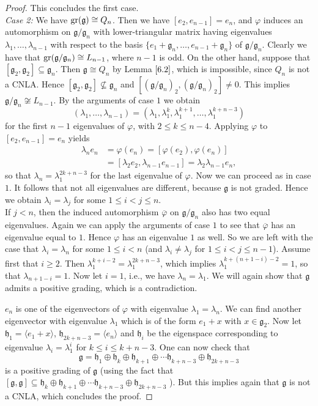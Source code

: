 \documentclass[12pt]{amsart}
\theoremstyle{definition}
\theoremstyle{remark}
\newcommand{\Lg}{\mathfrak{g}}
\newcommand{\Lh}{\mathfrak{h}}
\newcommand{\la}{\lambda}
\newcommand{\ov}{\overline}
\renewcommand{\phi}{\varphi}
\begin{document}
\begin{proof}
 This concludes the first case. \\[0.2cm]
{\em Case 2:} We have ${\rm gr}(\Lg)\cong Q_n$.
Then we have $[e_2,e_{n-1}]=e_n$, and $\phi$ induces an automorphism on $\Lg/\Lg_n$ with lower-triangular matrix
having eigenvalues $\la_1,\ldots ,\la_{n-1}$ with respect to the basis $\{ e_1+\Lg_n,\ldots ,e_{n-1}+\Lg_n\}$
of $\Lg/\Lg_n$. Clearly we have that ${\rm gr}(\Lg/\Lg_n)\cong L_{n-1}$, where $n-1$ is odd. On the other hand,
suppose that $[\Lg_2,\Lg_2]\subseteq \Lg_n$. Then $\Lg\cong Q_n$ by Lemma $\ref{6.2}$, which is impossible, since
$Q_n$ is not a CNLA. Hence $[\Lg_2,\Lg_2]\not\subseteq \Lg_n$ and $[(\Lg/\Lg_n)_2,(\Lg/\Lg_n)_2]\neq 0$. This implies
$\Lg/\Lg_n\not\cong L_{n-1}$. By the arguments of case $1$ we obtain
\[
(\la_1,\ldots ,\la_{n-1})=(\la_1,\la_1^k,\la_1^{k+1},\ldots , \la_1^{k+n-3})
\]
for the first $n-1$ eigenvalues of $\phi$, with $2\le k\le n-4$. Applying $\phi$ to $[e_2,e_{n-1}]=e_n$
yields
\begin{align*}
\la_ne_n & =\phi(e_n)=[\phi(e_2),\phi(e_n)] \\
         & = [\la_2e_2,\la_{n-1}e_{n-1}]=\la_2\la_{n-1}e_n,
\end{align*}
so that $\la_n=\la_1^{2k+n-3}$ for the last eigenvalue of $\phi$. Now we can proceed as in case $1$.
It follows that not all eigenvalues are different, because $\Lg$ is not graded. Hence we obtain
$\la_i=\la_j$ for some $1\leq i<j\leq n $.\\
If $j<n$, then the induced automorphism $\ov{\phi}$ on
$\Lg/\Lg_n$ also has two equal eigenvalues. Again we can apply the arguments of case $1$ to see that
$\ov{\phi}$ has an eigenvalue equal to $1$. Hence $\phi$ has an eigenvalue $1$ as well. So we are left with the case
that $\la_i=\la_n$ for some $1\le i<n$ (and $\la_i \neq \la_j$ for $1\leq i < j \leq n-1$). Assume first that $i\ge 2$. Then $\la_1^{k+i-2}=\la_1^{2k+n-3}$, which implies
$\la_1^{k+(n+1-i)-2}=1$, so that $\la_{n+1-i}=1$. Now let $i=1$, i.e., we have $\la_n=\la_1$. We will again show that $\Lg$ admits a positive grading, which is a contradiction.

$e_n$ is one of the eigenvectors of $\phi$ with eigenvalue $\la_1=\la_n$. We can find another eigenvector with eigenvalue $\lambda_1$ which is of the form $e_1+x$ with $x\in \Lg_2$. Now let $\Lh_1=\langle e_1+x \rangle$, $\Lh_{2k + n-3}=\langle e_n\rangle$ and $\Lh_i$ be the eigenspace corresponding to eigenvalue $\lambda_i= \lambda_1^i$ for $k\leq i \leq k+n-3$. One can now check that 
\[ \Lg = \Lh_1 \oplus \Lh_k \oplus \Lh_{k+1} \oplus \cdots\Lh_{k+n-3} \oplus \Lh_{2k +n -3} \]
is a positive grading of $\Lg$ (using the fact that  $[ \Lg,\Lg]\subseteq \Lh_k \oplus \Lh_{k+1} \oplus \cdots\Lh_{k+n-3} \oplus \Lh_{2k +n -3}$ ). But this implies again that $\Lg$ is not a CNLA, which concludes the proof. 

\end{proof}  
\end{document}
